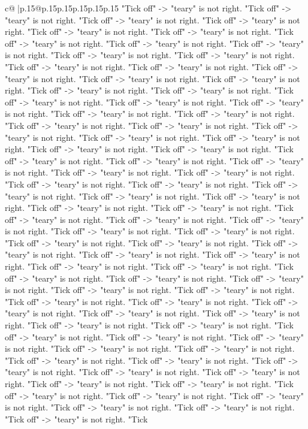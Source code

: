 \documentclass{article}
\begin{document}
{\begin{supertabular}{c@{$\;$}|p{.15\linewidth}@{}p{.15\linewidth}p{.15\linewidth}p{.15\linewidth}p{.15\linewidth}p{.15\linewidth}}
{{{"Tick off" {-}> "teary" is not right. "Tick off" {-}> "teary" is not right. "Tick off" {-}> "teary" is not right. "Tick off" {-}> "teary" is not right. "Tick off" {-}> "teary" is not right. "Tick off" {-}> "teary" is not right. "Tick off" {-}> "teary" is not right. "Tick off" {-}> "teary" is not right. "Tick off" {-}> "teary" is not right. "Tick off" {-}> "teary" is not right. "Tick off" {-}> "teary" is not right. "Tick off" {-}> "teary" is not right. "Tick off" {-}> "teary" is not right. "Tick off" {-}> "teary" is not right. "Tick off" {-}> "teary" is not right. "Tick off" {-}> "teary" is not right. "Tick off" {-}> "teary" is not right. "Tick off" {-}> "teary" is not right. "Tick off" {-}> "teary" is not right. "Tick off" {-}> "teary" is not right. "Tick off" {-}> "teary" is not right. "Tick off" {-}> "teary" is not right. "Tick off" {-}> "teary" is not right. "Tick off" {-}> "teary" is not right. "Tick off" {-}> "teary" is not right. "Tick off" {-}> "teary" is not right. "Tick off" {-}> "teary" is not right. "Tick off" {-}> "teary" is not right. "Tick off" {-}> "teary" is not right. "Tick off" {-}> "teary" is not right. "Tick off" {-}> "teary" is not right. "Tick off" {-}> "teary" is not right. "Tick off" {-}> "teary" is not right. "Tick off" {-}> "teary" is not right. "Tick off" {-}> "teary" is not right. "Tick off" {-}> "teary" is not right. "Tick off" {-}> "teary" is not right. "Tick off" {-}> "teary" is not right. "Tick off" {-}> "teary" is not right. "Tick off" {-}> "teary" is not right. "Tick off" {-}> "teary" is not right. "Tick off" {-}> "teary" is not right. "Tick off" {-}> "teary" is not right. "Tick off" {-}> "teary" is not right. "Tick off" {-}> "teary" is not right. "Tick off" {-}> "teary" is not right. "Tick off" {-}> "teary" is not right. "Tick off" {-}> "teary" is not right. "Tick off" {-}> "teary" is not right. "Tick off" {-}> "teary" is not right. "Tick off" {-}> "teary" is not right. "Tick off" {-}> "teary" is not right. "Tick off" {-}> "teary" is not right. "Tick off" {-}> "teary" is not right. "Tick off" {-}> "teary" is not right. "Tick off" {-}> "teary" is not right. "Tick off" {-}> "teary" is not right. "Tick off" {-}> "teary" is not right. "Tick off" {-}> "teary" is not right. "Tick off" {-}> "teary" is not right. "Tick off" {-}> "teary" is not right. "Tick off" {-}> "teary" is not right. "Tick off" {-}> "teary" is not right. "Tick off" {-}> "teary" is not right. "Tick off" {-}> "teary" is not right. "Tick off" {-}> "teary" is not right. "Tick off" {-}> "teary" is not right. "Tick off" {-}> "teary" is not right. "Tick off" {-}> "teary" is not right. "Tick off" {-}> "teary" is not right. "Tick off" {-}> "teary" is not right. "Tick off" {-}> "teary" is not right. "Tick off" {-}> "teary" is not right. "Tick off" {-}> "teary" is not right. "Tick off" {-}> "teary" is not right. "Tick off" {-}> "teary" is not right. "Tick off" {-}> "teary" is not right. "Tick off" {-}> "teary" is not right. "Tick off" {-}> "teary" is not right. "Tick off" {-}> "teary" is not right. "Tick off" {-}> "teary" is not right. "Tick off" {-}> "teary" is not right. "Tick off" {-}> "teary" is not right. "Tick off" {-}> "teary" is not right. "Tick }}}
\end{supertabular}}
\end{document}
